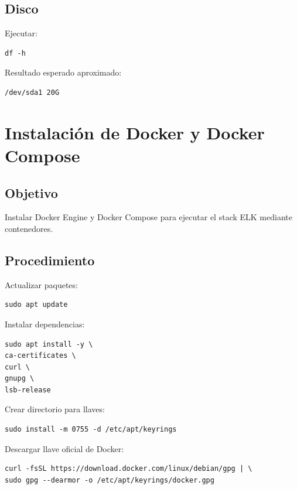 \documentclass[
  coursetitle={Cómputo Nube y Tecnologías Emergentes},
  coursehours={96},
  coursedate={Verano 2026},
  doctype={Laboratorio},
  otherlangs={english,french},
  authorname={Lázaro},
  authorsurname={Bustio-Martínez},
  authortitle={PhD},
  role={Profesor Investigador},
  email={lbustio@inaoe.mx},
  phone={5559504000},
  ext={7459},
  institution={Instituto Nacional de Astrofísica, Óptica y Electrónica (INAOE)},
  department={Maestría en Ciencias en Tecnologías de Seguridad},
  address={Luis Enrique Erro 1, Sta. Ma. Tonantzintla, San Andrés Cholula, CP 72840, Puebla, México},
  margin={0.5in}
]{../../lbustio_lecture_notes}
\begin{document}
\subsection{Disco}

Ejecutar:

\begin{lstlisting}
df -h
\end{lstlisting}

Resultado esperado aproximado:

\begin{verbatim}
/dev/sda1 20G
\end{verbatim}

\section{Instalación de Docker y Docker Compose}

\subsection{Objetivo}

Instalar Docker Engine y Docker Compose para ejecutar el stack ELK mediante contenedores.

\subsection{Procedimiento}

Actualizar paquetes:

\begin{lstlisting}
sudo apt update
\end{lstlisting}

Instalar dependencias:

\begin{lstlisting}
sudo apt install -y \
ca-certificates \
curl \
gnupg \
lsb-release
\end{lstlisting}

Crear directorio para llaves:

\begin{lstlisting}
sudo install -m 0755 -d /etc/apt/keyrings
\end{lstlisting}

Descargar llave oficial de Docker:

\begin{lstlisting}
curl -fsSL https://download.docker.com/linux/debian/gpg | \
sudo gpg --dearmor -o /etc/apt/keyrings/docker.gpg
\end{lstlisting}
\end{document}
